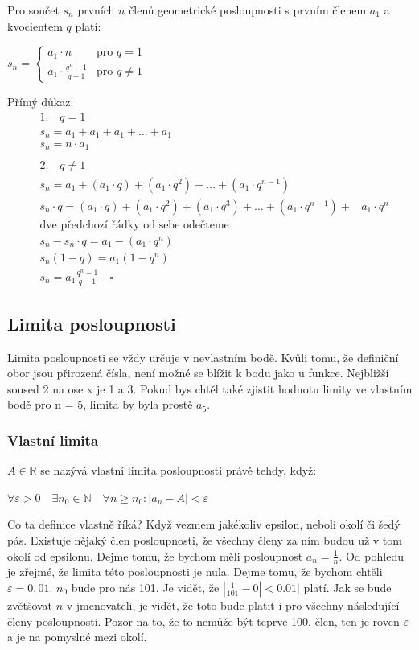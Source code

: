 \documentclass[12pt]{article}
\begin{document}
Pro součet $s_n$ prvních $n$ členů geometrické posloupnosti s prvním členem $a_1$ a kvocientem $q$
platí:

$s_n = \begin{cases} 
    a_1 \cdot n & \text{pro } q = 1 \\
    a_1 \cdot \frac{q^n - 1}{q - 1} & \text{pro } q \neq 1 
\end{cases}$

Přímý důkaz:
\[
\begin{align*}
    &1. \quad q = 1 \\
    &s_n = a_1 + a_1 + a_1 + \dots + a_1 \\
    &s_n = n \cdot a_1 \\\\
    &2. \quad q \neq 1 \\
    &s_n = a_1 + (a_1 \cdot q) + (a_1 \cdot q^2) + \dots + (a_1 \cdot q^{n-1}) \\
    &s_n \cdot q = (a_1 \cdot q) + (a_1 \cdot q^2) + (a_1 \cdot q^3) + \dots + (a_1 \cdot q^{n-1}) +
    &a_1 \cdot q^n \\
    &\text{dve předchozí řádky od sebe odečteme} \\
    &s_n - s_n \cdot q = a_1 - (a_1 \cdot q^n) \\
    &s_n(1 - q) = a_1(1 - q^n) \\
    &s_n = a_1 \frac{q^n - 1}{q - 1} \quad \square
\end{align*}
\]
\subsection*{Limita posloupnosti}
Limita posloupnosti se vždy určuje v nevlastním bodě. Kvůli tomu, že definiční obor jsou přirozená
čísla, není možné se blížit k bodu jako u funkce. Nejbližší soused 2 na ose x je 1 a 3. Pokud bys
chtěl také zjistit hodnotu limity ve vlastním bodě pro n = 5, limita by byla prostě $a_5$.
\subsubsection*{Vlastní limita}
$A \in \mathbb{R}$ se nazývá vlastní limita posloupnosti právě tehdy, když:

$\forall \varepsilon > 0 \quad \exists n_0 \in \mathbb{N} \quad \forall n \ge n_0 : |a_n - A| <
\varepsilon$

Co ta definice vlastně říká? Když vezmem jakékoliv epsilon, neboli okolí či šedý pás. Existuje nějaký
člen posloupnosti, že všechny členy za ním budou už v tom okolí od epsilonu. Dejme tomu, že bychom
měli posloupnost $a_n = \frac{1}{n}$. Od pohledu je zřejmé, že limita této posloupnosti je nula.
Dejme tomu, že bychom chtěli $\varepsilon = 0,01$. $n_0$ bude pro nás 101. Je vidět, že
$|\frac{1}{101} - 0| < 0.01|$ platí. Jak se bude zvětšovat $n$ v jmenovateli, je vidět, že toto bude
platit i pro všechny následující členy posloupnosti. Pozor na to, že to nemůže být teprve 100. člen,
ten je roven $\varepsilon$ a je na pomyslné mezi okolí.
\end{document}

